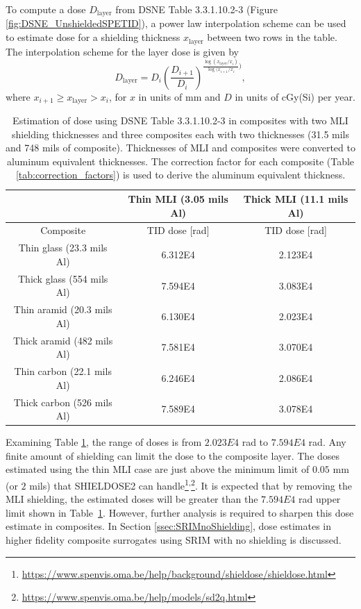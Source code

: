 \documentclass{hitec}
\begin{document}
To compute a dose $D_{\text{layer}}$ from DSNE Table 3.3.1.10.2-3 (Figure \ref{fig:DSNE_UnshieldedSPETID}), a power law interpolation scheme can be used to estimate dose for a shielding thickness $x_{\text{layer}}$ between two rows in the table. The interpolation scheme for the layer dose is given by
\begin{equation}
D_{\text{layer}} = D_i\left(\frac{D_{i+1}}{D_i}\right)^{\frac{\log(x_{\text{layer}}/x_i)}{\log(x_{i+1}/x_i})},
\end{equation}
where $x_{i+1} \ge x_{\text{layer}} > x_i$, for $x$ in units of mm and $D$ in units of cGy(Si) per year.

\begin{table}[h]\centering
	\caption{Estimation of dose using DSNE Table 3.3.1.10.2-3 in composites with two MLI shielding thicknesses and three composites each with two thicknesses (31.5 mils and 748 mils of composite). Thicknesses of MLI and composites were converted to aluminum equivalent thicknesses. The correction factor for each composite (Table \ref{tab:correction_factors}) is used to derive the aluminum equivalent thickness.}\label{tab:dose_composite_DSNE}
	\begin{tabular}{|c | c | c |}\hline
			 &Thin MLI (3.05 mils Al) & Thick MLI (11.1 mils Al) \\\hline
		Composite & TID dose [rad] &  TID dose [rad] \\\hline
		Thin glass (23.3 mils Al)   & 6.312E4 & 2.123E4 \\\hline
		Thick glass (554 mils Al)   & 7.594E4 & 3.083E4 \\\hline
		Thin aramid (20.3 mils Al)  & 6.130E4 & 2.023E4\\\hline
		Thick aramid (482 mils Al)  & 7.581E4 & 3.070E4\\\hline
		Thin carbon (22.1 mils Al)  & 6.246E4 & 2.086E4\\\hline
		Thick carbon (526 mils Al) & 7.589E4 & 3.078E4\\\hline
	\end{tabular}
\end{table}

Examining Table \ref{tab:dose_composite_DSNE}, the range of doses is from $2.023E4$ rad to $7.594E4$ rad. Any finite amount of shielding can limit the dose to the composite layer. The doses estimated using the thin MLI case are just above the minimum limit of $0.05$ mm (or $2$ mils) that SHIELDOSE2 can handle\footnote{\url{https://www.spenvis.oma.be/help/background/shieldose/shieldose.html}}\textsuperscript{,}\footnote{\url{https://www.spenvis.oma.be/help/models/sd2q.html}}. It is expected that by removing the MLI shielding, the estimated doses will be greater than the $7.594E4$ rad upper limit shown in Table~\ref{tab:dose_composite_DSNE}. However, further analysis is required to sharpen this dose estimate in composites. In Section \ref{ssec:SRIMnoShielding}, dose estimates in higher fidelity composite surrogates using SRIM with no shielding is discussed.
\end{document}
